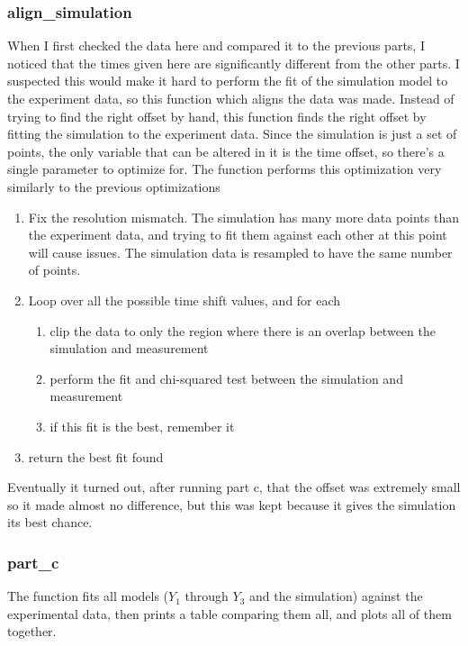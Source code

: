 \subsubsection{align\_simulation}
When I first checked the data here and compared it to the previous parts, I noticed that the times given here are significantly different from the other parts. I suspected this would make it hard to perform the fit of the simulation model to the experiment data, so this function which aligns the data was made. Instead of trying to find the right offset by hand, this function finds the right offset by fitting the simulation to the experiment data. Since the simulation is just a set of points, the only variable that can be altered in it is the time offset, so there's a single parameter to optimize for. The function performs this optimization very similarly to the previous optimizations
\begin{enumerate}
    \item Fix the resolution mismatch. The simulation has many more data points than the experiment data, and trying to fit them against each other at this point will cause issues. The simulation data is resampled to have the same number of points.
    \item Loop over all the possible time shift values, and for each
    \begin{enumerate}
        \item clip the data to only the region where there is an overlap between the simulation and measurement
        \item perform the fit and chi-squared test between the simulation and measurement 
        \item if this fit is the best, remember it 
    \end{enumerate}
    \item return the best fit found
\end{enumerate}
Eventually it turned out, after running part c, that the offset was extremely small so it made almost no difference, but this was kept because it gives the simulation its best chance.
\subsubsection{part\_c}
The function fits all models (\(Y_1\) through \(Y_3\) and the simulation) against the experimental data, then prints a table comparing them all, and plots all of them together. 